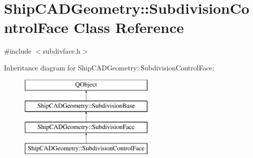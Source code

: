 \hypertarget{classShipCADGeometry_1_1SubdivisionControlFace}{\section{Ship\-C\-A\-D\-Geometry\-:\-:Subdivision\-Control\-Face Class Reference}
\label{classShipCADGeometry_1_1SubdivisionControlFace}
}


{\ttfamily \#include $<$subdivface.\-h$>$}

Inheritance diagram for Ship\-C\-A\-D\-Geometry\-:\-:Subdivision\-Control\-Face\-:\begin{figure}[H]
\begin{center}
\leavevmode
\includegraphics[height=4.000000cm]{classShipCADGeometry_1_1SubdivisionControlFace}
\end{center}
\end{figure}
